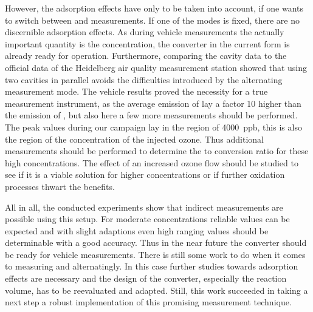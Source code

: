 However, the adsorption effects have only to be taken into account, if
one wants to switch between  and  measurements. If
one of the modes is fixed, there are no discernible adsorption
effects. As during vehicle measurements the actually important
quantity is the  concentration, the converter in the current
form is already ready for operation. Furthermore, comparing the cavity
data to the official data of the Heidelberg air quality measurement
station showed that using two cavities in parallel avoids the
difficulties introduced by the alternating measurement mode. The
vehicle results proved the necessity for a true  measurement
instrument, as the average emission of  lay a factor 10
higher than the emission of , but also here a few more
measurements should be performed. The peak  values during our
campaign lay in the region of \SI{4000}{ppb}, this is also the region
of the concentration of the injected ozone. Thus additional
measurements should be performed to determine the  to 
conversion ratio for these high concentrations. The effect of an
increased ozone flow should be studied to see if it is a viable
solution for higher concentrations or if further oxidation processes
thwart the benefits.

All in all, the conducted experiments show that indirect 
measurements are possible using this setup. For moderate
concentrations reliable  values can be expected and with
slight adaptions even high ranging  values should be
determinable with a good accuracy. Thus in the near future the
converter should be ready for  vehicle measurements. There is
still some work to do when it comes to measuring  and
 alternatingly. In this case further studies towards
adsorption effects are necessary and the design of the converter,
especially the reaction volume, has to be reevaluated and
adapted. Still, this work succeeded in taking a next step a robust
implementation of this promising measurement technique.

